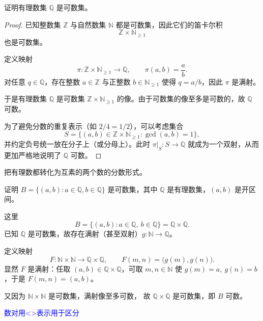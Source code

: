 \begin{homework}[1.14]
证明有理数集 $\mathbb{Q}$ 是可数集。
\end{homework}

\begin{proof}
已知整数集 $\mathbb{Z}$ 与自然数集 $\mathbb{N}$ 都是可数集，因此它们的笛卡尔积
\[
\mathbb{Z}\times\mathbb{N}_{\ge 1}
\]
也是可数集。

定义映射
\[
\pi:\mathbb{Z}\times\mathbb{N}_{\ge 1}\longrightarrow \mathbb{Q}, \qquad 
\pi(a,b)=\frac{a}{b}.
\]
对任意 $q\in\mathbb{Q}$，存在整数 $a\in\mathbb{Z}$ 与正整数 $b\in\mathbb{N}_{\ge1}$ 使得 $q=a/b$，因此 $\pi$ 是满射。

于是有理数集 $\mathbb{Q}$ 是可数集 $\mathbb{Z}\times\mathbb{N}_{\ge 1}$ 的像。由于可数集的像至多是可数的，故 $\mathbb{Q}$ 可数。

\medskip
为了避免分数的重复表示（如 $2/4=1/2$），可以考虑集合
\[
S=\{(a,b)\in\mathbb{Z}\times\mathbb{N}_{\ge1}:\gcd(a,b)=1\},
\]
并约定负号统一放在分子上（或分母上）。此时 $\pi|_{S}:S\to\mathbb{Q}$ 就成为一个双射，从而更加严格地说明了 $\mathbb{Q}$ 可数。
\end{proof}

\begin{dxtips}
    把有理数都转化为互素的两个数的分数形式。
\end{dxtips}

\begin{homework}[1.15]
证明 $B=\{(a,b): a\in \mathbb{Q}, b\in \mathbb{Q}\}$ 是可数集，其中 $\mathbb{Q}$ 是有理数集，$(a,b)$ 是开区间。
\end{homework}
\begin{solution}
这里
\[
B=\{(a,b):a\in\mathbb Q,\ b\in\mathbb Q\}=\mathbb Q\times\mathbb Q.
\]
已知 $\mathbb Q$ 是可数集，故存在满射（甚至双射）$g:\mathbb N\to\mathbb Q$。

定义映射
\[
F:\mathbb N\times\mathbb N\longrightarrow \mathbb Q\times\mathbb Q,\qquad
F(m,n)=\bigl(g(m),g(n)\bigr).
\]
显然 $F$ 是满射：任取 $(a,b)\in\mathbb Q\times\mathbb Q$，可取 $m,n\in\mathbb N$ 使
$g(m)=a,\ g(n)=b$，于是 $F(m,n)=(a,b)$。

又因为 $\mathbb N\times\mathbb N$ 是可数集，满射像至多可数，
故 $\mathbb Q\times\mathbb Q$ 是可数集，即 $B$ 可数。
\end{solution}
\textcolor{blue}{数对用<>表示用于区分}

